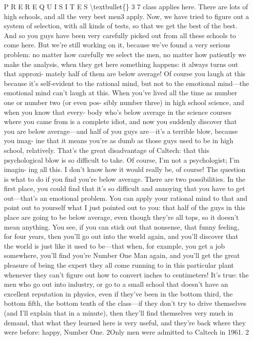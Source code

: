 \documentclass[10pt,oneside]{article}
\begin{document}
P R E R E Q U I S I T E S \textbackslash{}textbullet\{\} 3 7 class applies here. There are lots of high schools, and all the very best men3 apply. Now, we have tried to figure out a system of selection, with all kinds of tests, so that we get the best of the best. And so you guys have been very carefully picked out from all these schools to come here. But we’re still working on it, because we’ve found a very serious problem: no matter how carefully we select the men, no matter how patiently we make the analysis, when they get here something happens: it always turns out that approxi- mately half of them are below average! Of course you laugh at this because it’s self-evident to the rational mind, but not to the emotional mind---the emotional mind can’t laugh at this. When you’ve lived all the time as number one or number two (or even pos- sibly number three) in high school science, and when you know that every- body who’s below average in the science courses where you came from is a complete idiot, and now you suddenly discover that you are below average---and half of you guys are---it’s a terrible blow, because you imag- ine that it means you’re as dumb as those guys used to be in high school, relatively. That’s the great disadvantage of Caltech: that this psychological blow is so difficult to take. Of course, I’m not a psychologist; I’m imagin- ing all this. I don’t know how it would really be, of course! The question is what to do if you find you’re below average. There are two possibilities. In the first place, you could find that it’s so difficult and annoying that you have to get out---that’s an emotional problem. You can apply your rational mind to that and point out to yourself what I just pointed out to you: that half of the guys in this place are going to be below average, even though they’re all tops, so it doesn’t mean anything. You see, if you can stick out that nonsense, that funny feeling, for four years, then you’ll go out into the world again, and you’ll discover that the world is just like it used to be---that when, for example, you get a job somewhere, you’ll find you’re Number One Man again, and you’ll get the great pleasure of being the expert they all come running to in this particular plant whenever they can’t figure out how to convert inches to centimeters! It’s true: the men who go out into industry, or go to a small school that doesn’t have an excellent reputation in physics, even if they’ve been in the bottom third, the bottom fifth, the bottom tenth of the class---if they don’t try to drive themselves (and I’ll explain that in a minute), then they’ll find themselves very much in demand, that what they learned here is very useful, and they’re back where they were before: happy, Number One. 2Only men were admitted to Caltech in 1961. 2\par
\end{document}
